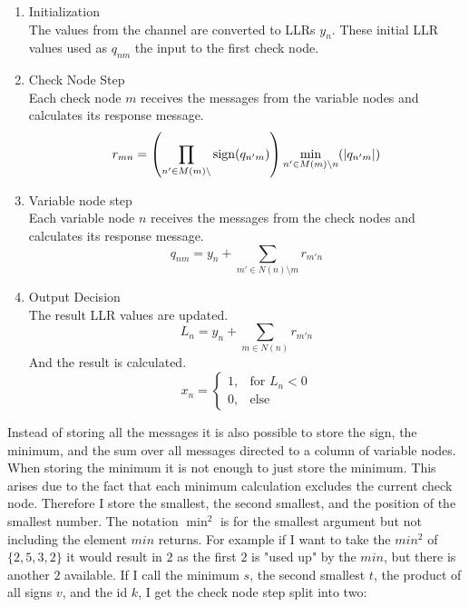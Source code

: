 \begin{enumerate}
\item{Initialization}\\
The values from the channel are converted to LLRs $y_n$. These initial LLR values used as $q_{nm}$ the input to the first check node.

\item{Check Node Step}\\
Each check node $m$ receives the messages from the variable nodes and calculates its response message.
\begin{equation}
    r_{mn} = \left( \prod_{n' \in M(m)\setminus }\operatorname{sign}(q_{n'm}) \right) \min_{n' \in M(m) \setminus n}(\left|q_{n'm}\right|)
\end{equation}

\item{Variable node step}\\
Each variable node $n$ receives the messages from the check nodes and calculates its response message.
\begin{equation}
    q_{nm} = y_n + \sum_{m' \in N(n)\setminus m}r_{m'n}
\end{equation}

\item{Output Decision}\\
The result LLR values are updated.
\begin{equation}
    L_n = y_n + \sum_{m \in N(n)}r_{m'n}
\end{equation}
And the result is calculated.
\begin{equation}
    x_n = \begin{cases}
        1, & \text{for } L_n < 0 \\
        0, & \text{else}
    \end{cases}
\end{equation}

\end{enumerate}

Instead of storing all the messages it is also possible to store the sign, the minimum, and the sum over all messages directed to a column of variable nodes. When storing the minimum it is not enough to just store the minimum. This arises due to the fact that each minimum calculation excludes the current check node. Therefore I store the smallest, the second smallest, and the position of the smallest number. The notation $\min^2$ is for the smallest argument but not including the element $min$ returns. For example if I want to take the $min^2$ of $\{2, 5, 3, 2\}$ it would result in $2$ as the first $2$ is "used up" by the $min$, but there is another $2$ available. If I call the minimum $s$, the second smallest $t$, the product of all signs $v$, and the id $k$, I get the check node step split into two:

